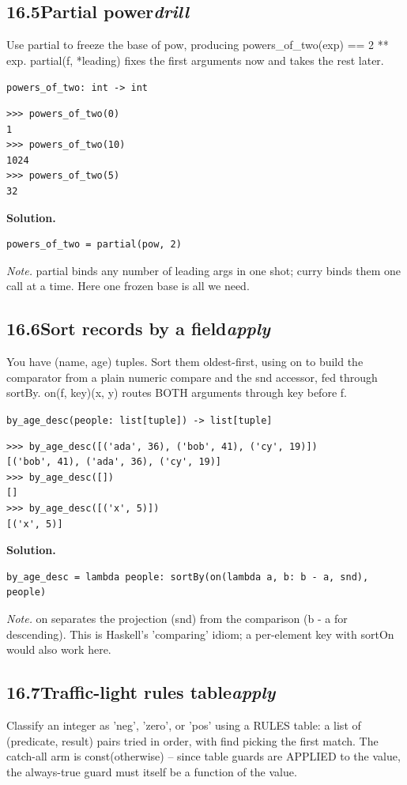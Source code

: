 \documentclass[10pt,letterpaper]{book}
\begin{document}
\subsection*{16.5\quad Partial power\hfill\textnormal{\textit{drill}}}
Use partial to freeze the base of pow, producing powers\_of\_two(exp) == 2 ** exp. partial(f, *leading) fixes the first arguments now and takes the rest later.

\noindent\texttt{powers\_of\_two: int -> int}
\begin{lstlisting}[style=ex]
>>> powers_of_two(0)
1
>>> powers_of_two(10)
1024
>>> powers_of_two(5)
32
\end{lstlisting}
\noindent\textbf{Solution.}
\begin{lstlisting}[style=code]
powers_of_two = partial(pow, 2)
\end{lstlisting}
\noindent\textit{Note.} partial binds any number of leading args in one shot; curry binds them one call at a time. Here one frozen base is all we need.

\subsection*{16.6\quad Sort records by a field\hfill\textnormal{\textit{apply}}}
You have (name, age) tuples. Sort them oldest-first, using on to build the comparator from a plain numeric compare and the snd accessor, fed through sortBy. on(f, key)(x, y) routes BOTH arguments through key before f.

\noindent\texttt{by\_age\_desc(people: list[tuple]) -> list[tuple]}
\begin{lstlisting}[style=ex]
>>> by_age_desc([('ada', 36), ('bob', 41), ('cy', 19)])
[('bob', 41), ('ada', 36), ('cy', 19)]
>>> by_age_desc([])
[]
>>> by_age_desc([('x', 5)])
[('x', 5)]
\end{lstlisting}
\noindent\textbf{Solution.}
\begin{lstlisting}[style=code]
by_age_desc = lambda people: sortBy(on(lambda a, b: b - a, snd), people)
\end{lstlisting}
\noindent\textit{Note.} on separates the projection (snd) from the comparison (b - a for descending). This is Haskell's 'comparing' idiom; a per-element key with sortOn would also work here.

\subsection*{16.7\quad Traffic-light rules table\hfill\textnormal{\textit{apply}}}
Classify an integer as 'neg', 'zero', or 'pos' using a RULES table: a list of (predicate, result) pairs tried in order, with find picking the first match. The catch-all arm is const(otherwise) -- since table guards are APPLIED to the value, the always-true guard must itself be a function of the value.
\end{document}

